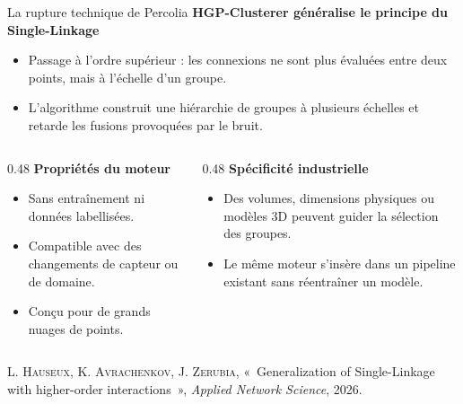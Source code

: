 \documentclass[A4,svgnames,10pt,aspectratio=169,usepdftitle=false]{beamer}
\begin{document}
\begin{frame}{La rupture technique de Percolia}
    \textbf{\bleu HGP-Clusterer généralise le principe du Single-Linkage}
    \begin{itemize}
        \item Passage à l'ordre supérieur : les connexions ne sont plus évaluées entre deux points, mais à l'échelle d'un groupe.
        \item L'algorithme construit une hiérarchie de groupes à plusieurs échelles et retarde les fusions provoquées par le bruit.
    \end{itemize}

    \vspace{0.2cm}
    \begin{columns}[T]
        \begin{column}{0.48\textwidth}
            \textbf{\orange Propriétés du moteur}
            \begin{itemize}
                \item Sans entraînement ni données labellisées.
                \item Compatible avec des changements de capteur ou de domaine.
                \item Conçu pour de grands nuages de points.
            \end{itemize}
        \end{column}

        \begin{column}{0.48\textwidth}
            \textbf{\orange Spécificité industrielle}
            \begin{itemize}
                \item Des volumes, dimensions physiques ou modèles 3D peuvent guider la sélection des groupes.
                \item Le même moteur s'insère dans un pipeline existant sans réentraîner un modèle.
            \end{itemize}
        \end{column}
    \end{columns}

    \vfill
    {\scriptsize L. \textsc{Hauseux}, K. \textsc{Avrachenkov}, J. \textsc{Zerubia}, «~Generalization of Single-Linkage with higher-order interactions~», \emph{Applied Network Science}, 2026.}
\end{frame}
\end{document}
